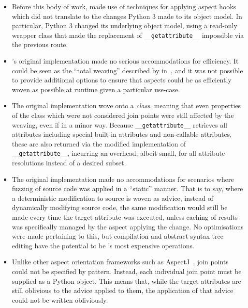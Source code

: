 \begin{itemize}
    \item Before this body of work, \pdsf made use of techniques for applying
    aspect hooks which did not translate to the changes Python 3 made to its
    object model. In particular, Python 3 changed its underlying object model,
    using a read-only wrapper class that made the replacement of
    \lstinline{__getattribute__} impossible via the previous route.
    \item \pdsf{}'s original implementation made no serious accommodations for
    efficiency. It could be seen as the ``total weaving'' described by
    \citeauthor{dynamicAOchitchyan} in~\cite{dynamicAOchitchyan}, and it was not
    possible to provide additional options to ensure that aspects could be as
    efficiently woven as possible at runtime given a particular use-case. 
    \item The original \pdsf implementation wove onto a \emph{class}, meaning
    that even properties of the class which were not considered join points were
    still affected by the weaving, even if in a minor way.  Because
    \lstinline{__getattribute__} retrieves all attributes including special
    built-in attributes and non-callable attributes, these are also returned via
    the modified implementation of \lstinline{__getattribute__}, incurring an
    overhead, albeit small, for all attribute resolutions instead of a desired
    subset.
    \item The original \pdsf implementation made no accommodations for scenarios
    where fuzzing of source code was applied in a ``static'' manner. That is to
    say, where a deterministic modification to source is woven as advice,
    instead of dynamically modifying source code, the same modification would
    still be made every time the target attribute was executed, unless caching
    of results was specifically managed by the aspect applying the change. No
    optimisations were made pertaining to this, but compilation and abstract
    syntax tree editing have the potential to be \pdsf{}'s most expensive
    operations.
    \item Unlike other aspect orientation frameworks such as
    AspectJ~\cite{aspectj_intro}, join points could not be specified by pattern.
    Instead, each individual join point must be supplied as a Python object.
    This means that, while the target attributes are still oblivious to the
    advice applied to them, the application of that advice could not be written
    obliviously.
\end{itemize}


